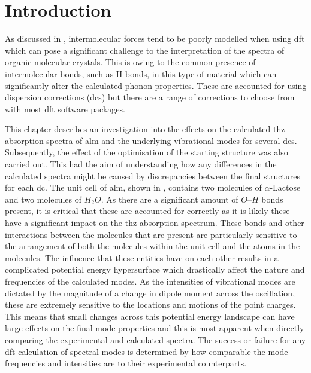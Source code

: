\section{Introduction}
As discussed in , intermolecular forces tend to be poorly modelled when using \acrshort{dft} which can pose a significant challenge to the interpretation of the spectra of organic molecular crystals. This is owing to the common presence of intermolecular bonds, such as H\nobreakdash-bonds, in this type of material which can significantly alter the calculated phonon properties. These are accounted for using dispersion corrections (\acrshort{dc}s) but there are a range of corrections to choose from with most \acrshort{dft} software packages. 

This chapter describes an investigation into the effects on the calculated \acrshort{thz} absorption spectra of \acrshort{alm} and the underlying vibrational modes for several \acrshort{dc}s. Subsequently, the effect of the optimisation of the starting structure was also carried out. This had the aim of understanding how any differences in the calculated spectra might be caused by discrepancies between the final structures for each \acrshort{dc}. The unit cell of \acrshort{alm}, shown in , contains two molecules of \(\alpha\)\nobreakdash-Lactose and two molecules of \(H_2O\). As there are a significant amount of \(O\)\nobreakdash--\(H\) bonds present, it is critical that these are accounted for correctly as it is likely these have a significant impact on the \acrshort{thz} absorption spectrum. These bonds and other interactions between the molecules that are present are particularly sensitive to the arrangement of both the molecules within the unit cell and the atoms in the molecules. The influence that these entities have on each other results in a complicated potential energy hypersurface which drastically affect the nature and frequencies of the calculated modes. As the intensities of vibrational modes are dictated by the magnitude of a change in dipole moment across the oscillation, these are extremely sensitive to the locations and motions of the point charges. This means that small changes across this potential energy landscape can have large effects on the final mode properties and this is most apparent when directly comparing the experimental and calculated spectra. The success or failure for any \acrshort{dft} calculation of spectral modes is determined by how comparable the mode frequencies and intensities are to their experimental counterparts. 

